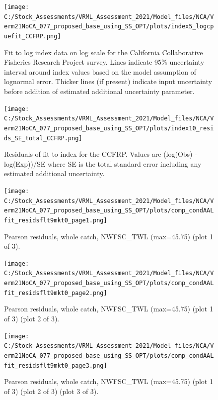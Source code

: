 \documentclass[11pt,
  english,
  a4paper,
]{article}
\begin{document}
\begin{figure}
\centering
\texttt{[image: C:/Stock\_Assessments/VRML\_Assessment\_2021/Model\_files/NCA/Verm21NoCA\_077\_proposed\_base\_using\_SS\_OPT/plots/index5\_logcpuefit\_CCFRP.png]}
\caption{Fit to log index data on log scale for the California Collaborative Fisheries Research Project survey. Lines indicate 95\% uncertainty interval around index values based on the model assumption of lognormal error. Thicker lines (if present) indicate input uncertainty before addition of estimated additional uncertainty parameter.\label{fig:log-cpue-CCFRP}}
\end{figure}

\begin{figure}
\centering
\texttt{[image: C:/Stock\_Assessments/VRML\_Assessment\_2021/Model\_files/NCA/Verm21NoCA\_077\_proposed\_base\_using\_SS\_OPT/plots/index10\_resids\_SE\_total\_CCFRP.png]}
\caption{Residuals of fit to index for the CCFRP. Values are (log(Obs) - log(Exp))/SE where SE is the total standard error including any estimated additional uncertainty.\label{fig:cpue-resid-CCFRP}}
\end{figure}

\begin{figure}
\centering
\texttt{[image: C:/Stock\_Assessments/VRML\_Assessment\_2021/Model\_files/NCA/Verm21NoCA\_077\_proposed\_base\_using\_SS\_OPT/plots/comp\_condAALfit\_residsflt9mkt0\_page1.png]}
\caption{Pearson residuals, whole catch, NWFSC\_TWL (max=45.75) (plot 1 of 3).\label{fig:comp_condAALfit_residsflt9mkt0_page1}}
\end{figure}

\begin{figure}
\centering
\texttt{[image: C:/Stock\_Assessments/VRML\_Assessment\_2021/Model\_files/NCA/Verm21NoCA\_077\_proposed\_base\_using\_SS\_OPT/plots/comp\_condAALfit\_residsflt9mkt0\_page2.png]}
\caption{Pearson residuals, whole catch, NWFSC\_TWL (max=45.75) (plot 1 of 3) (plot 2 of 3).\label{fig:comp_condAALfit_residsflt9mkt0_page2}}
\end{figure}

\begin{figure}
\centering
\texttt{[image: C:/Stock\_Assessments/VRML\_Assessment\_2021/Model\_files/NCA/Verm21NoCA\_077\_proposed\_base\_using\_SS\_OPT/plots/comp\_condAALfit\_residsflt9mkt0\_page3.png]}
\caption{Pearson residuals, whole catch, NWFSC\_TWL (max=45.75) (plot 1 of 3) (plot 2 of 3) (plot 3 of 3).\label{fig:comp_condAALfit_residsflt9mkt0_page3}}
\end{figure}
\end{document}
